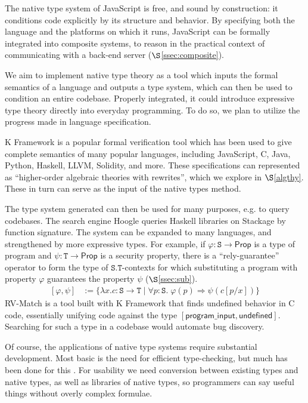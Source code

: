 \documentclass[12pt]{article}
\theoremstyle{definition}
\newcommand{\msf}[1]{\mathsf{#1}}
\newcommand{\mtt}[1]{\mathtt{#1}}
\newcommand{\ra}{\Rightarrow}
\newcommand{\Prop}{\msf{Prop}}
\newcommand{\tts}{\mtt{S}}
\newcommand{\ttt}{\mtt{T}}
\begin{document}
The native type system of JavaScript is free, and sound by construction: it conditions code explicitly by its structure and behavior.  By specifying both the language and the platforms on which it runs, JavaScript can be formally integrated into composite systems, to reason in the practical context of communicating with a back-end server ($\S$\ref{ssec:composite}).

We aim to implement native type theory as a tool which inputs the formal semantics of a language and outputs a type system, which can then be used to condition an entire codebase. Properly integrated, it could introduce expressive type theory directly into everyday programming. To do so, we plan to utilize the progress made in language specification.

K Framework \cite{kframe} is a popular formal verification tool which has been used to give complete semantics of many popular languages, including JavaScript, C, Java, Python, Haskell, LLVM, Solidity, and more.  These specifications can represented as ``higher-order algebraic theories with rewrites'', which we explore in $\S$\ref{algthy}. These in turn can serve as the input of the native types method.

The type system generated can then be used for many purposes, e.g. to query codebases. The search engine Hoogle \cite{hoogle} queries Haskell libraries on Stackage by function signature. The system can be expanded to many languages, and strengthened by more expressive types. For example, if $\varphi:\tts\to \Prop$ is a type of program and $\psi:\ttt\to \Prop$ is a security property, there is a ``rely-guarantee'' operator to form the type of $\tts.\ttt$-contexts for which substituting a program with property $\varphi$ guarantees the property $\psi$ ($\S$\ref{ssec:sub}).
\[\begin{array}{ll}
    [\varphi, \psi] & := \{\lambda x.c:\tts\to \ttt \;|\; \forall p : \tts.\; \varphi(p) \ra \psi(c[p/x])\}
\end{array} \]
RV-Match \cite{RVMatch} is a tool built with K Framework that finds undefined behavior in C code, essentially unifying code against the type $[\mathsf{program\_input}, \mathsf{undefined}]$.  Searching for such a type in a codebase would automate bug discovery.

Of course, the applications of native type systems require substantial development. Most basic is the need for efficient type-checking, but much has been done for this \cite{coqTypeCheck}. For usability we need conversion between existing types and native types, as well as libraries of native types, so programmers can say useful things without overly complex formulae.
\end{document}
